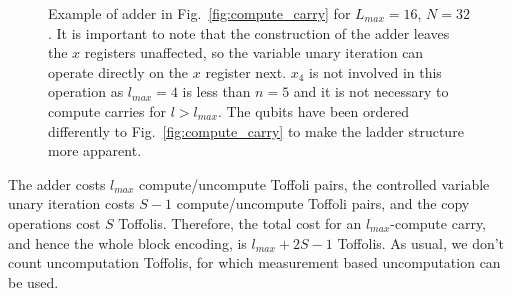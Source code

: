 \documentclass[a4paper,twocolumn,,accepted=2025-05-27]{quantumarticle}
\theoremstyle{empty}
\begin{document}
\begin{figure}
\centering

\caption{\label{fig:adder}Example of adder in Fig.~\ref{fig:compute_carry} for $L_{max} = 16$, $N=32$. It is important to note that the construction of the adder leaves the $x$ registers unaffected, so the variable unary iteration can operate directly on the $x$ register next. $x_4$ is not involved in this operation as $l_{max}=4$ is less than $n=5$ and it is not necessary to compute carries for $l > l_{max}$. The qubits have been ordered differently to Fig.~\ref{fig:compute_carry} to make the ladder structure more apparent.}
\end{figure}

The adder costs $l_{max}$ compute/uncompute Toffoli pairs, the controlled variable unary iteration costs $S-1$ compute/uncompute Toffoli pairs, and the copy operations cost $S$ Toffolis.  Therefore, the total cost for an $l_{max}$-compute carry, and hence the whole block encoding, is $l_{max} + 2S - 1$ Toffolis. As usual, we don't count uncomputation Toffolis, for which measurement based uncomputation can be used.
\end{document}
